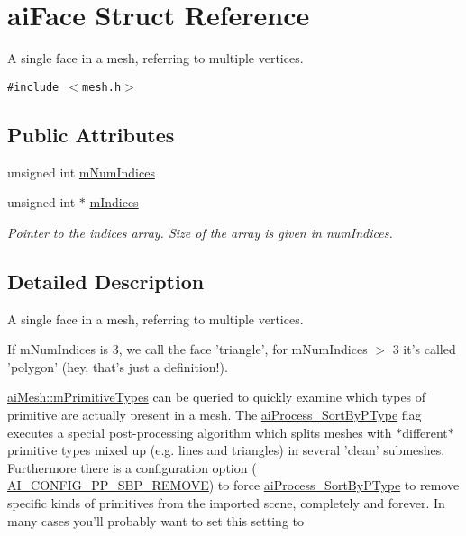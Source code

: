 \hypertarget{structai_face}{
\section{aiFace Struct Reference}
\label{structai_face}
}
A single face in a mesh, referring to multiple vertices.  


{\tt \#include $<$mesh.h$>$}

\subsection*{Public Attributes}
\begin{CompactItemize}
\item 
unsigned int \hyperlink{structai_face_dda2698cec0ebfe651572f4a5701360b}{mNumIndices}
\item 
\hypertarget{structai_face_2026b434c40cf1636f9f464a592ec36c}{
unsigned int $\ast$ \hyperlink{structai_face_2026b434c40cf1636f9f464a592ec36c}{mIndices}}
\label{structai_face_2026b434c40cf1636f9f464a592ec36c}

\begin{CompactList}\small\item\em Pointer to the indices array. Size of the array is given in numIndices. \item\end{CompactList}\end{CompactItemize}


\subsection{Detailed Description}
A single face in a mesh, referring to multiple vertices. 

If mNumIndices is 3, we call the face 'triangle', for mNumIndices $>$ 3 it's called 'polygon' (hey, that's just a definition!). \par
 \hyperlink{structai_mesh_99d66ac0a444068c1b252b30265cbf53}{aiMesh::mPrimitiveTypes} can be queried to quickly examine which types of primitive are actually present in a mesh. The \hyperlink{postprocess_8h_64795260b95f5a4b3f3dc1be4f52e410b4484f73635d633cd79973bac1431ed6}{aiProcess\_\-SortByPType} flag executes a special post-processing algorithm which splits meshes with $\ast$different$\ast$ primitive types mixed up (e.g. lines and triangles) in several 'clean' submeshes. Furthermore there is a configuration option ( \hyperlink{config_8h_971e337cb0d526861142586b8341cb98}{AI\_\-CONFIG\_\-PP\_\-SBP\_\-REMOVE}) to force \hyperlink{postprocess_8h_64795260b95f5a4b3f3dc1be4f52e410b4484f73635d633cd79973bac1431ed6}{aiProcess\_\-SortByPType} to remove specific kinds of primitives from the imported scene, completely and forever. In many cases you'll probably want to set this setting to 

